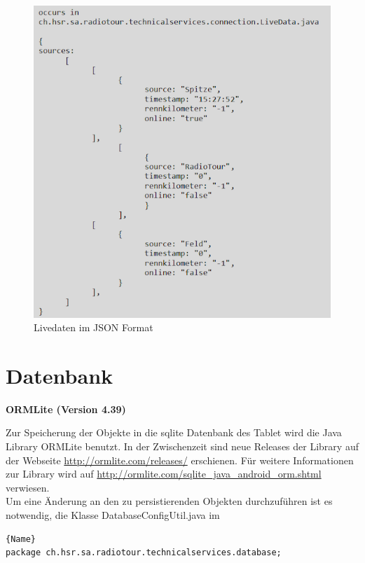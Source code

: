 \begin{figure}[H]
\caption{Livedaten im JSON Format}
\label{fig:jsonreceive}
\centering
\includegraphics[scale=0.9]{05bericht/images/json2.png}
\end{figure}

\newpage

\section{Datenbank}
\textbf{ORMLite (Version 4.39)}

 
Zur Speicherung der Objekte in die \gls{sqlite} Datenbank des Tablet wird die Java Library ORMLite benutzt. In der Zwischenzeit sind neue Releases der Library auf der Webseite \url{http://ormlite.com/releases/} erschienen. Für weitere Informationen zur Library wird auf \url{http://ormlite.com/sqlite_java_android_orm.shtml} verwiesen.
\\
Um eine Änderung an den zu persistierenden Objekten durchzuführen ist es notwendig, die Klasse DatabaseConfigUtil.java im

\begin{lstlisting}{Name}
package ch.hsr.sa.radiotour.technicalservices.database;
\end{lstlisting}

